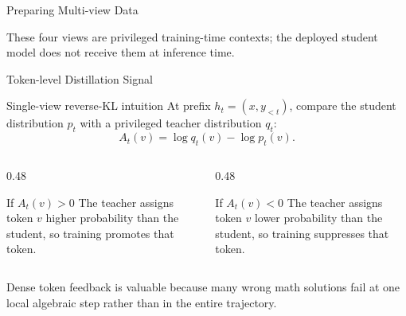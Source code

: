 \documentclass[aspectratio=169]{beamer}
\begin{document}
\begin{frame}{Preparing Multi-view Data}
  \scriptsize

  \vspace{0.25cm}
  \small
  These four views are privileged training-time contexts; the deployed student
  model does not receive them at inference time.
\end{frame}

\begin{frame}{Token-level Distillation Signal}
  \small
  \begin{block}{Single-view reverse-KL intuition}
    At prefix $h_t=(x,y_{<t})$, compare the student distribution $p_t$ with a
    privileged teacher distribution $q_t$:
    \[
      A_t(v)=\log q_t(v)-\log p_t(v).
    \]
  \end{block}

  \begin{columns}[T,onlytextwidth]
    \begin{column}{0.48\textwidth}
      \begin{block}{If $A_t(v)>0$}
        The teacher assigns token $v$ higher probability than the student, so
        training promotes that token.
      \end{block}
    \end{column}
    \begin{column}{0.48\textwidth}
      \begin{block}{If $A_t(v)<0$}
        The teacher assigns token $v$ lower probability than the student, so
        training suppresses that token.
      \end{block}
    \end{column}
  \end{columns}

  \vspace{0.2cm}
  Dense token feedback is valuable because many wrong math solutions fail at
  one local algebraic step rather than in the entire trajectory.
\end{frame}
\end{document}
